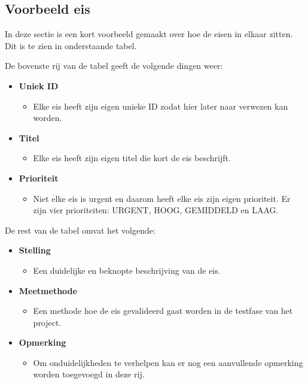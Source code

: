 \newpage

\subsection{Voorbeeld eis}

In deze sectie is een kort voorbeeld gemaakt over hoe de eisen in elkaar zitten. Dit is te zien in onderstaande tabel.


De bovenste rij van de tabel geeft de volgende dingen weer:

\begin{itemize}
	\item \textbf{Uniek ID}
	\begin{itemize}
		\item Elke eis heeft zijn eigen unieke ID zodat hier later naar verwezen kan worden.
	\end{itemize}
	
	\item \textbf{Titel}
	\begin{itemize}
		\item Elke eis heeft zijn eigen titel die kort de eis beschrijft.
	\end{itemize}
	
	\item \textbf{Prioriteit}
	\begin{itemize}
		\item Niet elke eis is urgent en daarom heeft elke eis zijn eigen prioriteit. Er zijn vier prioriteiten: URGENT, HOOG, GEMIDDELD en LAAG.
	\end{itemize}
\end{itemize}

De rest van de tabel omvat het volgende:

\begin{itemize}
	\item \textbf{Stelling}
	\begin{itemize}
		\item Een duidelijke en beknopte beschrijving van de eis.
	\end{itemize}
	
	\item \textbf{Meetmethode}
	\begin{itemize}
		\item Een methode hoe de eis gevalideerd gaat worden in de testfase van het project.
	\end{itemize}
	
	\item \textbf{Opmerking}
	\begin{itemize}
		\item Om onduidelijkheden te verhelpen kan er nog een aanvullende opmerking worden toegevoegd in deze rij.
	\end{itemize}
\end{itemize}

